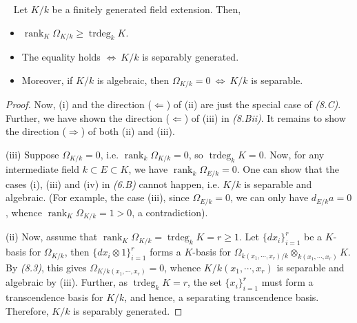 \documentclass[11pt,a4paper,footinclude=true,headinclude=true]{scrbook} %
\DeclareMathOperator{\trdeg}{trdeg}
\DeclareMathOperator{\rank}{rank}
\newcommand{\<}{\langle}
\newcommand{\>}{\rangle}
\newenvironment{theorem}[2][]
{\renewcommand\theinnercustomthm{#2}\innercustomthm[#1]
\begin{mdframed}[backgroundcolor=yellow!20]\ }
{\end{mdframed}\endinnercustomthm}
\begin{document}
\begin{theorem}{8.6}
    Let $K/k$ be a finitely generated field extension. Then,
    \begin{itemize}
        \item[(i)] $\rank_K\Omega_{K/k}\geq\trdeg_kK$.
        \item[(ii)] The equality holds $\Longleftrightarrow\ K/k$ is separably generated.
        \item[(iii)] Moreover, if $K/k$ is algebraic, then $\Omega_{K/k}=0\ \Longleftrightarrow\ K/k$ is separable.
    \end{itemize}
\end{theorem}
\begin{proof}
    Now, (i) and the direction ($\Leftarrow$) of (ii) are just the special case of \textit{(8.C)}. Further, we have shown the direction ($\Leftarrow$) of (iii) in \textit{(8.Bii)}. It remains to show the direction ($\Rightarrow$) of both (ii) and (iii).
    
    (iii) Suppose $\Omega_{K/k}=0$, i.e. $\rank_k\Omega_{K/k}=0$, so $\trdeg_kK=0$. Now, for any intermediate field $k\subset E\subset K$, we have $\rank_k\Omega_{E/k}=0$. One can show that the cases (i), (iii) and (iv) in \textit{(6.B)} cannot happen, i.e. $K/k$ is separable and algebraic. (For example, the case (iii), since $\Omega_{E/k}=0$, we can only have $d_{E/k}a=0$, whence $\rank_K\Omega_{K/k}=1>0$, a contradiction).
    
    (ii) Now, assume that $\rank_K\Omega_{K/k}=\trdeg_kK=r\geq1$. Let $\{dx_i\}_{i=1}^r$ be a $K$-basis for $\Omega_{K/k}$, then $\{dx_i\otimes1\}_{i=1}^r$ forms a $K$-basis for $\Omega_{k(x_1,\cdots,x_r)/k}\otimes_{k(x_1,\cdots,x_r)}K$. By \textit{(8.3)}, this gives $\Omega_{K/k(x_1,\cdots,x_r)}=0$, whence $K/k(x_1,\cdots,x_r)$ is separable and algebraic by (iii). Further, as $\trdeg_kK=r$, the set $\{x_i\}_{i=1}^r$ must form a transcendence basis for $K/k$, and hence, a separating transcendence basis. Therefore, $K/k$ is separably generated.
\end{proof}
\end{document}

